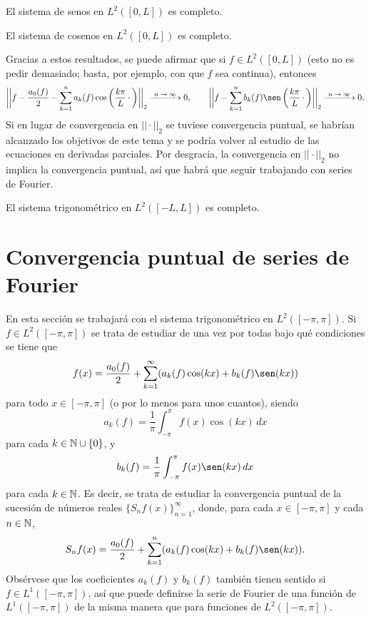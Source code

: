 \documentclass[a4paper, 12pt, extrafontsizes]{memoir}
\begin{document}
\begin{theorem}
    El sistema de senos en $L^2([0,L])$ es completo.
\end{theorem}

\begin{theorem}
    El sistema de cosenos en $L^2([0,L])$ es completo.
\end{theorem}

Gracias a estos resultados, se puede afirmar que si $f \in L^2([0,L])$ (esto no es pedir demasiado; basta, por ejemplo, con que $f$ sea continua), entonces
\[ \biggl|\biggl|f - \frac{a_0(f)}{2}-\sum_{k=1}^n a_k(f)\cos\left(\frac{k\pi}{L}\, \cdot \,\right)\biggr|\biggr|_2 \nconv 0, \qquad \biggl|\biggl|f - \sum_{k=1}^n b_k(f)\sen\left(\frac{k\pi}{L}\, \cdot \,\right)\biggr|\biggr|_2 \nconv 0.\]
Si en lugar de convergencia en $||\cdot||_2$ se tuviese convergencia puntual, se habrían alcanzado los objetivos de este tema y se podría volver al estudio de las ecuaciones en derivadas parciales. Por desgracia, la convergencia en $||\cdot||_2$ no implica la convergencia puntual, así que habrá que seguir trabajando con series de Fourier.

\begin{theorem}
    El sistema trigonométrico en $L^2([-L,L])$ es completo.
\end{theorem}

\section{Convergencia puntual de series de Fourier}

En esta sección se trabajará con el sistema trigonométrico en $L^2([-\pi,\pi])$. Si $f \in L^2([-\pi,\pi])$ se trata de estudiar de una vez por todas bajo qué condiciones se tiene que
\[f(x) = \frac{a_0(f)}{2}+\sum_{k=1}^\infty (a_k(f)\cos(kx) + b_k(f)\sen(kx))\]
para todo $x \in [-\pi,\pi]$ (o por lo menos para unos cuantos), siendo 
\[a_k(f) = \frac{1}{\pi}\int_{-\pi}^\pi f(x)\cos(kx)\, dx\] para cada $k \in \mathbb N \cup \{0\}$, y \[b_k(f) = \frac{1}{\pi}\int_{-\pi}^\pi f(x)\sen(kx) \, dx\]
para cada $k \in \mathbb N$. Es decir, se trata de estudiar la convergencia puntual de la sucesión de números reales $\{S_nf(x)\}_{n=1}^\infty$, donde, para cada $x \in [-\pi,\pi]$ y cada $n \in \mathbb N$,
\[S_nf(x) = \frac{a_0(f)}{2}+\sum_{k=1}^n (a_k(f)\cos(kx) + b_k(f)\sen(kx)).\]
Obsérvese que los coeficientes $a_k(f)$ y $b_k(f)$ también tienen sentido si $f \in L^1([-\pi,\pi])$, así que puede definirse la serie de Fourier de una función de $L^1([-\pi,\pi])$ de la misma manera que para funciones de $L^2([-\pi,\pi])$.
\end{document}
